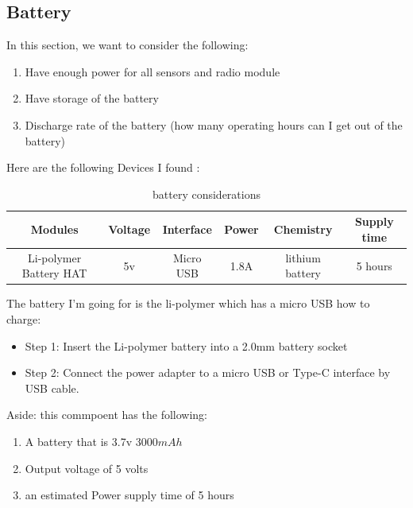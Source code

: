 \subsection{Battery}
In this section, we want to consider the  following:
\begin{enumerate}
	\item Have enough power for all  sensors  and  radio module
	\item Have storage of the battery
	\item Discharge rate of the  battery (how many operating hours can I get out of the  battery)
\end{enumerate}
Here are the following  Devices I found :
\begin{table}[h!]
	\centering
	\begin{tabular}{|c|c|c|c|c|c|}
		\hline
		Modules & Voltage & Interface & Power & Chemistry & Supply time\\
		\hline
			Li-polymer Battery HAT  & 5v & Micro USB & 1.8A &lithium battery &5 hours \\ \hline
	\end{tabular}
	\caption{battery considerations}
	\label{battery considerations}
\end{table}

The battery I'm going for is the li-polymer which has a micro USB 
how to charge:
\begin{itemize}
	\item Step 1: Insert the Li-polymer battery into a 2.0mm battery socket
	\item Step 2: Connect the power adapter to a micro USB or Type-C interface by USB cable.
\end{itemize}
Aside: this commpoent has the following:
\begin{enumerate}
	\item A battery that is 3.7v 3000$mAh$ 
	\item Output voltage of 5 volts
	\item an estimated Power supply time  of  5 hours
\end{enumerate}
